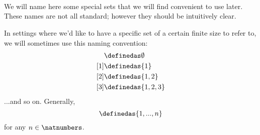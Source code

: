 {\

\



\


We will name here some special sets that we will find convenient to use later. These names are not all standard; however they should be intuitively clear.

In settings where we'd like to have a specific set of a certain finite size to refer to, we will sometimes use this naming convention:
\begin{align*}
[0]
  & \definedas \emptyset \\
  [1] & \definedas \{ 1\} \\
  [2] & \definedas \{ 1, 2\} \\
  [3] & \definedas \{ 1, 2, 3\}
\end{align*}
...and so on. Generally,
\begin{equation}
[n]
  \definedas \{ 1, ..., n\}
\end{equation}
for any $n \in \natnumbers$.}



\clearpage
